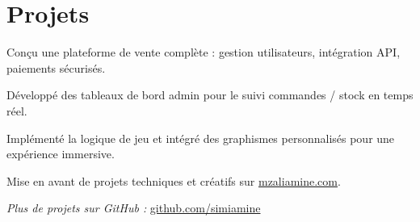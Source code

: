 \documentclass[]{deedy-resume-reversed}
\begin{document}
\begin{minipage}[t]{0.60\textwidth}
\section{Projets}

\begin{tightemize}
    \item Conçu une plateforme de vente complète : gestion utilisateurs, intégration API, paiements sécurisés.
    \item Développé des tableaux de bord admin pour le suivi commandes / stock en temps réel.
\end{tightemize}
\sectionsep

\begin{tightemize}
    \item Implémenté la logique de jeu et intégré des graphismes personnalisés pour une expérience immersive.
\end{tightemize}
\sectionsep

\begin{tightemize}
    \item Mise en avant de projets techniques et créatifs sur \href{https://mzaliamine.com}{mzaliamine.com}.
\end{tightemize}
\sectionsep

\textit{Plus de projets sur GitHub :} 
 \href{https://github.com/simiamine}{github.com/simiamine}

\end{minipage}
\hfill
\end{document}
